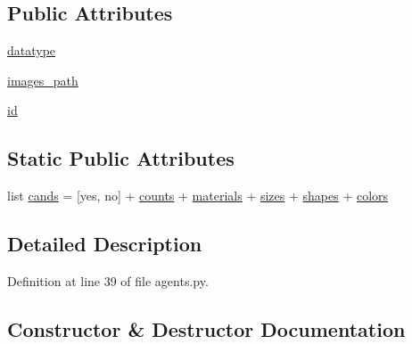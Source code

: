 \subsection*{Public Attributes}
\begin{DoxyCompactItemize}
\item 
\hyperlink{classparlai_1_1tasks_1_1clevr_1_1agents_1_1DefaultTeacher_a7bdb21c7cb0d04c3470c069125ea3d4a}{datatype}
\item 
\hyperlink{classparlai_1_1tasks_1_1clevr_1_1agents_1_1DefaultTeacher_a524bed88c209582a3ccdc7693ba08214}{images\+\_\+path}
\item 
\hyperlink{classparlai_1_1tasks_1_1clevr_1_1agents_1_1DefaultTeacher_ab936a3d7fc5e5249495d9a42a30d0708}{id}
\end{DoxyCompactItemize}
\subsection*{Static Public Attributes}
\begin{DoxyCompactItemize}
\item 
list \hyperlink{classparlai_1_1tasks_1_1clevr_1_1agents_1_1DefaultTeacher_ac6422c7d4dc173edcbafae2ce5f2552b}{cands} = \mbox{[}\textquotesingle{}yes\textquotesingle{}, \textquotesingle{}no\textquotesingle{}\mbox{]} + \hyperlink{namespaceparlai_1_1tasks_1_1clevr_1_1agents_addbc9f5c2379e29136fbbf55b1dfb333}{counts} + \hyperlink{namespaceparlai_1_1tasks_1_1clevr_1_1agents_a73f08794aae5cb7c2a5cc9d1d662e082}{materials} + \hyperlink{namespaceparlai_1_1tasks_1_1clevr_1_1agents_a565c7b5d57a9f93a062d7a130f6ba989}{sizes} + \hyperlink{namespaceparlai_1_1tasks_1_1clevr_1_1agents_ac54e3cd91825301baef61b929e13c0b4}{shapes} + \hyperlink{namespaceparlai_1_1tasks_1_1clevr_1_1agents_a18c5435aea4ab46265cd4c70c7f04718}{colors}
\end{DoxyCompactItemize}


\subsection{Detailed Description}


Definition at line 39 of file agents.\+py.



\subsection{Constructor \& Destructor Documentation}
\mbox{\label{classparlai_1_1tasks_1_1clevr_1_1agents_1_1DefaultTeacher_a6b201b7448a18fbc9c75ffd75ed6febb}} 
